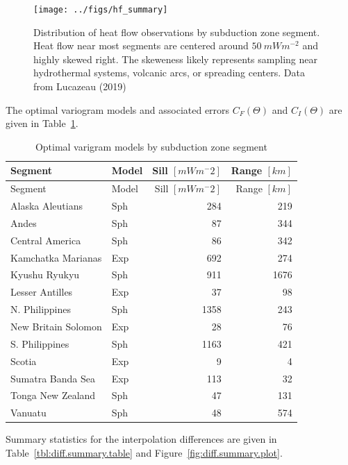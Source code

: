 \documentclass[draft,linenumbers]{agujournal2018}
\begin{document}
\begin{figure}[h]

{\centering \texttt{[image: ../figs/hf\_summary]} 

}

\caption{Distribution of heat flow observations by subduction zone segment. Heat flow near most segments are centered around $50~mWm^{-2}$ and highly skewed right. The skeweness likely represents sampling near hydrothermal systems, volcanic arcs, or spreading centers. Data from Lucazeau (2019)}\label{fig:hf.summary.plot}
\end{figure}

\clearpage

The optimal variogram models and associated errors \(C_F(\Theta)\) and
\(C_I(\Theta)\) are given in Table~\ref{tbl:variogram.summary.table}.

\hypertarget{tbl:variogram.summary.table}{}
\begin{longtable}[]{@{}llrr@{}}
\caption{\label{tbl:variogram.summary.table}Optimal varigram models by
subduction zone segment}\tabularnewline
\toprule
Segment & Model & Sill \([mWm^-{2}]\) & Range \([km]\) \\
\midrule
\endfirsthead
\toprule
Segment & Model & Sill \([mWm^-{2}]\) & Range \([km]\) \\
\midrule
\endhead
Alaska Aleutians & Sph & 284 & 219 \\
Andes & Sph & 87 & 344 \\
Central America & Sph & 86 & 342 \\
Kamchatka Marianas & Exp & 692 & 274 \\
Kyushu Ryukyu & Sph & 911 & 1676 \\
Lesser Antilles & Exp & 37 & 98 \\
N. Philippines & Sph & 1358 & 243 \\
New Britain Solomon & Exp & 28 & 76 \\
S. Philippines & Sph & 1163 & 421 \\
Scotia & Exp & 9 & 4 \\
Sumatra Banda Sea & Exp & 113 & 32 \\
Tonga New Zealand & Sph & 47 & 131 \\
Vanuatu & Sph & 48 & 574 \\
\bottomrule
\end{longtable}

\clearpage

Summary statistics for the interpolation differences are given in
Table~\ref{tbl:diff.summary.table} and
Figure~\ref{fig:diff.summary.plot}.
\end{document}

